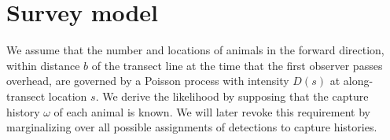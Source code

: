 \documentclass[useAMS, usenatbib, referee]{biom}\usepackage[]{graphicx}\usepackage[]{color}
\begin{document}


\section{Survey model}


We assume that the number and locations of animals in the forward direction, within distance $b$ of the transect line at the time that the first observer passes overhead, are governed by a Poisson process with intensity $D(s)$ at along-transect location $s$. We derive the likelihood by supposing that the capture history $\omega$ of each animal is known. We will later revoke this requirement by marginalizing over all possible assignments of detections to capture histories.

\end{document}
